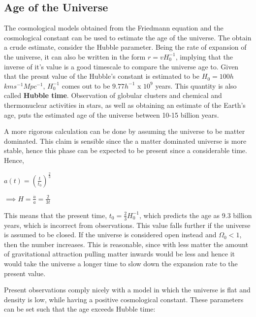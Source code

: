 \documentclass{article}
\begin{document}

\subsection{Age of the Universe}
The cosmological models obtained from the Friedmann equation and the cosmological constant can be used to estimate the age of the universe. The obtain a crude estimate, consider the Hubble parameter. Being the rate of expansion of the universe, it can also be written in the form $r = v H_0^{-1}$, implying that the inverse of it's value is a good timescale to compare the universe age to. Given that the presnt value of the Hubble's constant is estimated to be $H_0 = 100h$ $km s^{-1} Mpc^{-1}$, $H_0^{-1}$ comes out to be $9.77h^{-1}$ x $10^9$ years. This quantity is also called \textbf{Hubble time}. Observation of globular clusters and chemical and thermonuclear activities in stars, as well as obtaining an estimate of the Earth's age, puts the estimated age of the universe between 10-15 billion years. 

A more rigorous calculation can be done by assuming the universe to be matter dominated. This claim is sensible since the a matter dominated universe is more stable, hence this phase can be expected to be present since a considerable time. Hence,

\begin{center}
    $a(t) = (\frac{t}{t_0})^{\frac{2}{3}}$
\end{center}

\begin{center}
    $\implies H = \frac{\dot{a}}{a} = \frac{2}{3t}$
\end{center}

This means that the present time, $t_0 = \frac{2}{3}H_0^{-1}$, which predicts the age as 9.3 billion years, which is incorrect from observations. This value falls further if the universe is assumed to be closed. If the universe is considered open instead and $\Omega_{0}<1$, then the number increases. This is reasonable, since with less matter the amount of gravitational attraction pulling matter inwards would be less and hence it would take the universe a longer time to slow down the expansion rate to the present value. 

Present observations comply nicely with a model in which the universe is flat and density is low, while having a positive cosmological constant. These parameters can be set such that the age exceeds Hubble time:
\end{document}
